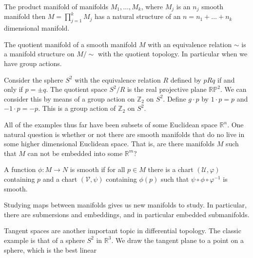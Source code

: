         \begin{definition}
            The product manifold of manifolds $M_{1},\hdots,M_{k}$, where
            $M_{j}$ is an $n_{j}$ smooth manifold then
            $M=\prod_{j=1}^{k}M_{j}$ has a natural structure of an
            $n=n_{1}+\dots+n_{k}$ dimensional manifold.
        \end{definition}
        \begin{definition}
            The quotient manifold of a smooth manifold $M$ with an equivalence
            relation $\sim$ is a manifold structure on $M/\sim$ with the
            quotient topology. In particular when we have group actions.
        \end{definition}
        \begin{example}
            Consider the sphere $S^{2}$ with the equivalence relation $R$
            defined by $pRq$ if and only if $p=\pm{q}$. The quotient space
            $S^{2}/R$ is the real projective plane $\mathbb{RP}^{2}$. We can
            consider this by means of a group action on $\mathbb{Z}_{2}$ on
            $S^{2}$. Define $g\cdot{p}$ by $1\cdot{p}=p$ and
            $\minus{1}\cdot{p}=\minus{p}$. This is a group action of
            $\mathbb{Z}_{2}$ on $S^{2}$.
        \end{example}
        All of the examples thus far have been subsets of some Euclidean space
        $\mathbb{R}^{n}$. One natural question is whether or not there are
        smooth manifolds that do no live in some higher dimensional Euclidean
        space. That is, are there manifolds $M$ such that $M$ can not be
        embedded into some $\mathbb{R}^{m}$?
        \begin{definition}
            A function $\phi:M\rightarrow{N}$ is smooth if for all $p\in{M}$
            there is a chart $(\mathcal{U},\varphi)$ containing $p$ and a
            chart $(\mathcal{V},\psi)$ containing $\phi(p)$ such that
            $\psi\circ\phi\circ\varphi^{\minus{1}}$ is smooth.
        \end{definition}
        Studying maps between manifolds gives us new manifolds to study. In
        particular, there are submersions and embeddings, and in particular
        embedded submanifolds.
        \par\hfill\par
        Tangent spaces are another important topic in differential topology. The
        classic example is that of a sphere $S^{2}$ in $\mathbb{R}^{3}$. We draw
        the tangent plane to a point on a sphere, which is the best linear
